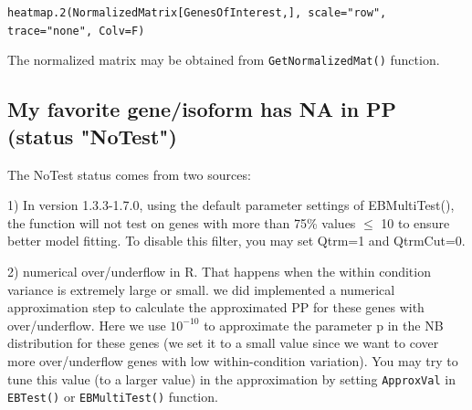 \documentclass{article}
\begin{document}
\verb+heatmap.2(NormalizedMatrix[GenesOfInterest,], scale="row", trace="none", Colv=F)+

The normalized matrix may be obtained from \verb+GetNormalizedMat()+ function.


\subsection{My favorite gene/isoform has NA in PP (status "NoTest")}

\indent The NoTest status comes from two sources:

1) In version 1.3.3-1.7.0, using the default parameter settings of EBMultiTest(), the function
will not test on genes with more than 75\% values $\le$ 10 to ensure better
model fitting. To disable this filter, you may set Qtrm=1 and
QtrmCut=0.

2) numerical over/underflow in R. That happens when the within
condition variance is extremely large or small. we did implemented a numerical
approximation step to calculate the approximated PP for these genes
with over/underflow. Here we use $10^{-10}$ to approximate the parameter p
in the NB distribution for these genes (we set it to a small value
since we want to cover more over/underflow genes with low
within-condition variation). You may try to tune this value (to a larger value) in the
approximation by setting \verb+ApproxVal+ in \verb+EBTest()+ or \verb+EBMultiTest()+ function. 

\pagebreak


\end{document}
